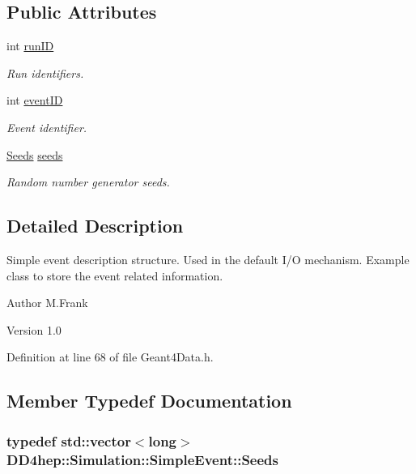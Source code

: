\subsection*{Public Attributes}
\begin{DoxyCompactItemize}
\item 
int \hyperlink{class_d_d4hep_1_1_simulation_1_1_simple_event_a128035e74755e19ac0fc4526e959a96c}{runID}
\begin{DoxyCompactList}\small\item\em Run identifiers. \item\end{DoxyCompactList}\item 
int \hyperlink{class_d_d4hep_1_1_simulation_1_1_simple_event_a6c196367ec2be5a8cad2afe89d038a6d}{eventID}
\begin{DoxyCompactList}\small\item\em Event identifier. \item\end{DoxyCompactList}\item 
\hyperlink{class_d_d4hep_1_1_simulation_1_1_simple_event_a0a0e9b422036edb384b60a6f492eb8d4}{Seeds} \hyperlink{class_d_d4hep_1_1_simulation_1_1_simple_event_a6284fef7dbe512536fad17533444e325}{seeds}
\begin{DoxyCompactList}\small\item\em Random number generator seeds. \item\end{DoxyCompactList}\end{DoxyCompactItemize}


\subsection{Detailed Description}
Simple event description structure. Used in the default I/O mechanism. Example class to store the event related information.

\begin{DoxyAuthor}{Author}
M.Frank 
\end{DoxyAuthor}
\begin{DoxyVersion}{Version}
1.0 
\end{DoxyVersion}


Definition at line 68 of file Geant4Data.h.

\subsection{Member Typedef Documentation}
\hypertarget{class_d_d4hep_1_1_simulation_1_1_simple_event_a0a0e9b422036edb384b60a6f492eb8d4}{
\subsubsection[{Seeds}]{\setlength{\rightskip}{0pt plus 5cm}typedef std::vector$<$long$>$ {\bf DD4hep::Simulation::SimpleEvent::Seeds}}}
\label{class_d_d4hep_1_1_simulation_1_1_simple_event_a0a0e9b422036edb384b60a6f492eb8d4}


